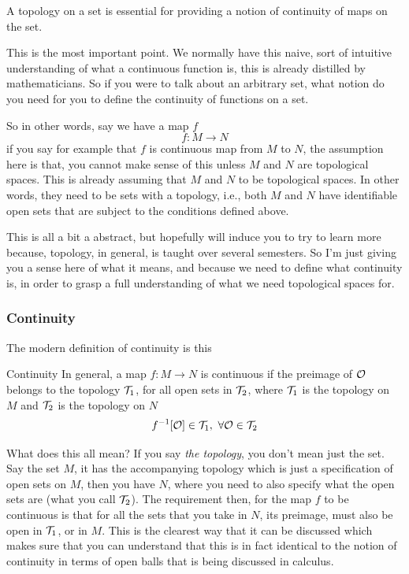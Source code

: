 		A topology on a set is essential for providing a notion of continuity of maps on the set. 

		This is the most important point. We normally have this naive, sort of intuitive understanding of what a continuous function is, this is already 
		distilled by mathematicians. So if you were to talk about an arbitrary set, what notion do you need for you to 
		define the continuity of functions on a set. 

		So in other words, say we have a map $f$
		\[
			f:M\to N
		\]
		if you say for example that $f$ is continuous map from $M$ to $N$, the assumption here is that, you cannot make sense of this unless
		$M$ and $N$ are topological spaces. This is already assuming that $M$ and $N$ to be topological spaces. In other words, they need to be sets 
		with a topology, i.e., both $M$ and $N$ have identifiable open sets that are subject to the conditions defined above.

		This is all a bit a abstract, but hopefully will induce you to try to learn more because, topology, in general, is taught over several semesters. So
		I'm just giving you a sense here of what it means, and because we need to define what continuity is, in order to grasp a 
		full understanding of what we need topological spaces for.

	\subsubsection{Continuity}
		The modern definition of continuity is this
		\begin{definition}{Continuity}		    
			In general, a map $f:M\to N$ is continuous if the preimage of $\mathcal{O}$ belongs to the topology $\mathcal{T}_1$, for all open sets in $\mathcal{T}_2$, where $\mathcal{T}_1$ is the topology on $M$ and $\mathcal{T}_2$ is the topology on $N$
			\[
				f^{-1}[\mathcal{O}]\in\mathcal{T}_1,\ \forall \mathcal{O}\in\mathcal{T}_2
			\]
		\end{definition}
		What does this all mean? If you say \textit{the topology}, you don't mean just the set. Say the set $M$, it has the accompanying topology which is just a specification
		of open sets on $M$, then you have $N$, where you need to also specify what the open sets are (what you call $\mathcal{T}_2$). The requirement then, for the map $f$ to 
		be continuous is that for all the sets that you take in $N$, its preimage, must also be open in $\mathcal{T}_1$, or in $M$. This
		is the clearest way that it can be discussed which makes sure that you can understand that this is in fact identical to the notion of continuity in terms of open balls
		that is being discussed in calculus.

